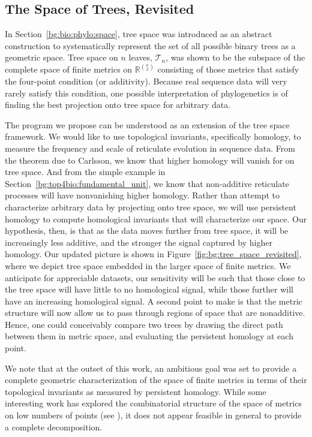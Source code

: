 \subsection{The Space of Trees, Revisited}
\label{bg:top4bio:tree_space}

In Section~\ref{bg:bio:phylo:space}, tree space was introduced as an abstract construction to systematically represent the set of all possible binary trees as a geometric space.
Tree space on $n$ leaves, $\mathcal{T}_n$, was shown to be the subspace of the complete space of finite metrics on $\mathbb{R}^{\binom{n}{2}}$ consisting of those metrics that satisfy the four-point condition (or additivity).
Because real sequence data will very rarely satisfy this condition, one possible interpretation of phylogenetics is of finding the best projection onto tree space for arbitrary data.

The program we propose can be understood as an extension of the tree space framework.
We would like to use topological invariants, specifically homology, to measure the frequency and scale of reticulate evolution in sequence data.
From the theorem due to Carlsson, we know that higher homology will vanish for on tree space.
And from the simple example in Section~\ref{bg:top4bio:fundamental_unit}, we know that non-additive reticulate processes will have nonvanishing higher homology.
Rather than attempt to characterize arbitrary data by projecting onto tree space, we will use persistent homology to compute homological invariants that will characterize our space.
Our hypothesis, then, is that as the data moves further from tree space, it will be increasingly less additive, and the stronger the signal captured by higher homology.
Our updated picture is shown in Figure~\ref{fig:bg:tree_space_revisited}, where we depict tree space embedded in the larger space of finite metrics.
We anticipate for appreciable datasets, our sensitivity will be such that those close to the tree space will have little to no homological signal, while those further will have an increasing homological signal.
A second point to make is that the metric structure will now allow us to pass through regions of space that are nonadditive.
Hence, one could conceivably compare two trees by drawing the direct path between them in metric space, and evaluating the persistent homology at each point.

We note that at the outset of this work, an ambitious goal was set to provide a complete geometric characterization of the space of finite metrics in terms of their topological invariants as measured by persistent homology.
While some interesting work has explored the combinatorial structure of the space of metrics on low numbers of points (see \cite{Sturmfels:2004vc}), it does not appear feasible in general to provide a complete decomposition.

